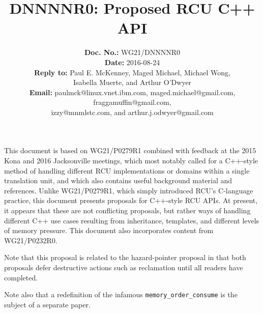 \documentclass[letterpaper,twocolumn,10pt]{article}
\begin{document}
\newcommand{\co}[1]{\lstinline[breaklines=yes,breakatwhitespace=yes]{#1}}

\title{DNNNNR0: Proposed RCU C++ API}

\author{
{\bf Doc. No.: } WG21/DNNNNR0 \\
{\bf Date: } 2016-08-24 \\
{\bf Reply to: } Paul E. McKenney, Maged Michael, Michael Wong,\\
Isabella Muerte, and Arthur O'Dwyer\\
{\bf Email: } paulmck@linux.vnet.ibm.com, maged.michael@gmail.com,
fraggamuffin@gmail.com,\\
izzy@mnmlstc.com, and arthur.j.odwyer@gmail.com
} %


\pagestyle{myheadings}

\maketitle


This document is based on WG21/P0279R1 combined with feedback at
the 2015 Kona and 2016 Jacksonville meetings, which most notably called
for a C++-style method of handling different RCU implementations or
domains within a single translation unit, and which also contains
useful background material and references.
Unlike WG21/P0279R1, which simply introduced RCU's C-language practice,
this document presents proposals for C++-style RCU APIs.
At present, it appears that these are not conflicting proposals, but
rather ways of handling different C++ use cases resulting from
inheritance, templates, and different levels of memory pressure.
This document also incorporates content from
WG21/P0232R0\cite{PaulEMcKennneyToolKitP0232R0}.

Note that this proposal is related to the hazard-pointer proposal in
that both proposals defer destructive actions such as reclamation until
all readers have completed.

Note also that a redefinition of the infamous \co{memory_order_consume}
is the subject of a separate paper.
\end{document}
